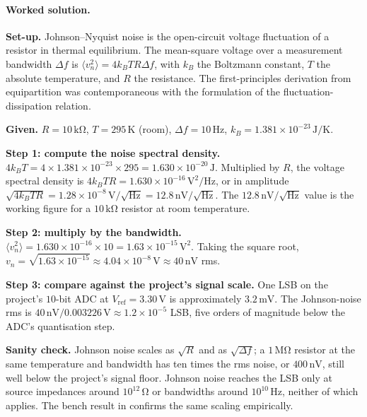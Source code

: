 \paragraph{Worked solution.}
\textbf{Set-up.} Johnson--Nyquist noise is the open-circuit voltage
fluctuation of a resistor in thermal equilibrium. The mean-square
voltage over a measurement bandwidth $\Delta f$ is
$\langle v_{n}^{2} \rangle = 4 k_{B} T R \Delta f$, with $k_{B}$
the Boltzmann constant, $T$ the absolute temperature, and $R$ the
resistance. The first-principles derivation
\cite{paper:ch05-johnson-1928, paper:ch05-nyquist-1928} from
equipartition was contemporaneous with the formulation of the
fluctuation-dissipation relation.

\textbf{Given.} $R = 10 \,\si{\kilo\ohm}$, $T = 295 \,\si{\kelvin}$
(room), $\Delta f = 10 \,\si{\hertz}$, $k_{B} = 1.381 \times
10^{-23} \,\si{\joule\per\kelvin}$.

\textbf{Step 1: compute the noise spectral density.}
$4 k_{B} T = 4 \times 1.381 \times 10^{-23} \times 295 = 1.630
\times 10^{-20} \,\si{\joule}$. Multiplied by $R$, the
voltage spectral density is $4 k_{B} T R = 1.630 \times 10^{-16}
\,\si{\volt\squared\per\hertz}$, or in
amplitude $\sqrt{4 k_{B} T R} = 1.28 \times 10^{-8} \,\si{\volt}/
\sqrt{\si{\hertz}} = 12.8 \,\si{\nano\volt}/\sqrt{\si{\hertz}}$.
The $12.8 \,\si{\nano\volt}/\sqrt{\si{\hertz}}$ value is the
working figure for a $10 \,\si{\kilo\ohm}$ resistor at room
temperature.

\textbf{Step 2: multiply by the bandwidth.}
$\langle v_{n}^{2} \rangle = 1.630 \times 10^{-16} \times 10 =
1.63 \times 10^{-15} \,\si{\volt\squared}$. Taking the square root,
$v_{n} = \sqrt{1.63 \times 10^{-15}} \approx 4.04 \times 10^{-8}
\,\si{\volt} \approx 40 \,\si{\nano\volt}$ rms.

\textbf{Step 3: compare against the project's signal scale.} One
LSB on the project's $10$-bit ADC at $V_{\text{ref}} = 3.30 \,\si
{\volt}$ is approximately $3.2 \,\si{\milli\volt}$. The
Johnson-noise rms is $40 \,\si{\nano\volt}/0.003226 \,\si{\volt}
\approx 1.2 \times 10^{-5}$ LSB, five orders of magnitude below
the ADC's quantisation step.

\textbf{Sanity check.} Johnson noise scales as $\sqrt{R}$ and as
$\sqrt{\Delta f}$; a $1 \,\si{\mega\ohm}$ resistor at the same
temperature and bandwidth has ten times the rms noise, or $400
\,\si{\nano\volt}$, still well below the project's signal floor.
Johnson noise reaches the LSB only at source impedances around
$10^{12} \,\si{\ohm}$ or bandwidths around $10^{10} \,\si{\hertz}$,
neither of which applies. The bench result in
 confirms the same scaling
empirically.

